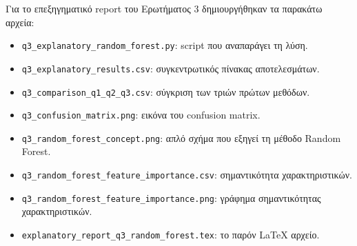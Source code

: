 \documentclass[12pt,a4paper]{article}
\newcommand{\code}[1]{\texttt{\textenglish{#1}}}
\begin{document}
Για το επεξηγηματικό report του Ερωτήματος 3 δημιουργήθηκαν τα παρακάτω
αρχεία:

\begin{itemize}
    \item \code{q3\_explanatory\_random\_forest.py}: script που αναπαράγει τη
    λύση.
    \item \code{q3\_explanatory\_results.csv}: συγκεντρωτικός πίνακας
    αποτελεσμάτων.
    \item \code{q3\_comparison\_q1\_q2\_q3.csv}: σύγκριση των τριών πρώτων
    μεθόδων.
    \item \code{q3\_confusion\_matrix.png}: εικόνα του confusion matrix.
    \item \code{q3\_random\_forest\_concept.png}: απλό σχήμα που εξηγεί τη
    μέθοδο Random Forest.
    \item \code{q3\_random\_forest\_feature\_importance.csv}: σημαντικότητα
    χαρακτηριστικών.
    \item \code{q3\_random\_forest\_feature\_importance.png}: γράφημα
    σημαντικότητας χαρακτηριστικών.
    \item \code{explanatory\_report\_q3\_random\_forest.tex}: το παρόν
    LaTeX αρχείο.
\end{itemize}
\end{document}
